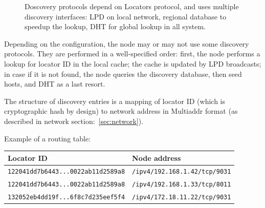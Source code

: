 \documentclass[acmlarge, screen, nonacm, 11pt]{acmart}
\newcommand{\code}[1]{\texttt{#1}}
\begin{document}
\begin{figure}
  \begin{center}
  \end{center}
  \caption{
    Doscovery protocols depend on Locators protocol,
    and uses multiple discovery interfaces: LPD on local network,
    regional database to speedup the lookup, DHT for global lookup
    in all system.
  }\label{fig:discovery-protocol}
\end{figure}

Depending on the configuration, the node may or may not use some discovery protocols.
They are performed in a well-specified order: first,
the node performs a lookup for locator ID in the local cache; the cache is updated
by LPD broadcasts; in case if it is not found, the node queries the discovery
database, then seed hosts, and DHT as a last resort.

The structure of discovery entries is a mapping of locator ID
(which is cryptographic hash by design) to network address
in Multiaddr format (as described in network section:~\ref{sec:network}).

Example of a routing table:

\begin{tabular}{l | l}
  Locator ID & Node address \\ \hline
  \code{122041dd7b6443...0022ab11d2589a8} & \code{/ipv4/192.168.1.42/tcp/9031} \\
  \code{122041dd7b6443...0022ab11d2589a8} & \code{/ipv4/192.168.1.33/tcp/8011} \\
  \code{132052eb4dd19f...6f8c7d235eef5f4} & \code{/ipv4/172.18.11.22/tcp/9031} \\
\end{tabular}
\end{document}
